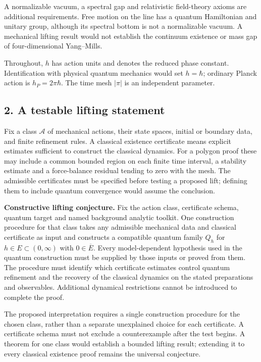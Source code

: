 \documentclass[11pt,a4paper]{article}
\begin{document}
A normalizable vacuum, a spectral gap and relativistic field-theory
axioms are additional requirements. Free motion on the line has a
quantum Hamiltonian and unitary group, although its spectral bottom is
not a normalizable vacuum. A mechanical lifting result would not
establish the continuum existence or mass gap of four-dimensional
Yang--Mills.

Throughout, \(h\) has action units and denotes the reduced phase
constant. Identification with physical quantum mechanics would set
\(h=\hbar\); ordinary Planck action is \(h_P=2\pi\hbar\). The time mesh
\(|\pi|\) is an independent parameter.

\hypertarget{a-testable-lifting-statement}{%
\subsection{2. A testable lifting
statement}\label{a-testable-lifting-statement}}

Fix a class \(\mathcal A\) of mechanical actions, their state spaces,
initial or boundary data, and finite refinement rules. A classical
existence certificate means explicit estimates sufficient to construct
the classical dynamics. For a polygon proof these may include a common
bounded region on each finite time interval, a stability estimate and a
force-balance residual tending to zero with the mesh. The admissible
certificates must be specified before testing a proposed lift; defining
them to include quantum convergence would assume the conclusion.

\textbf{Constructive lifting conjecture.} Fix the action class,
certificate schema, quantum target and named background analytic
toolkit. One construction procedure for that class takes any admissible
mechanical data and classical certificate as input and constructs a
compatible quantum family \(Q_h\) for \(h\in E\subset(0,\infty)\) with
\(0\in\overline E\). Every model-dependent hypothesis used in the
quantum construction must be supplied by those inputs or proved from
them. The procedure must identify which certificate estimates control
quantum refinement and the recovery of the classical dynamics on the
stated preparations and observables. Additional dynamical restrictions
cannot be introduced to complete the proof.

The proposed interpretation requires a single construction procedure for
the chosen class, rather than a separate unexplained choice for each
certificate. A certificate schema must not exclude a counterexample
after the test begins. A theorem for one class would establish a bounded
lifting result; extending it to every classical existence proof remains
the universal conjecture.
\end{document}
